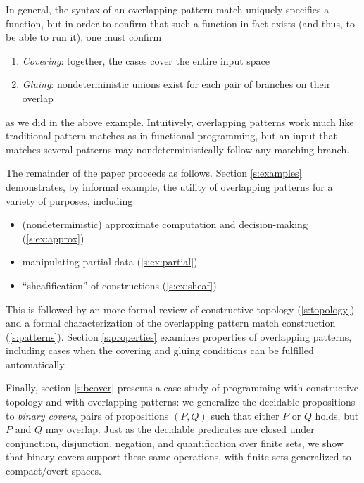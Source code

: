 \documentclass[conference]{IEEEtran}
\newcommand{\R}{\mathbb{R}}
\begin{document}
In general, the syntax of an overlapping pattern match uniquely specifies a function, but in order to confirm that such a function in fact exists (and thus, to be able to run it), one must confirm
\begin{enumerate}
\item \emph{Covering}: together, the cases cover the entire input space
\item \emph{Gluing}: nondeterministic unions exist for each pair of branches on their overlap
\end{enumerate}
as we did in the above example. Intuitively, overlapping patterns work much like traditional pattern matches as in functional programming, but an input that matches several patterns may nondeterministically follow any matching branch.


The remainder of the paper proceeds as follows. Section \ref{s:examples} demonstrates, by informal example, the utility of overlapping patterns for a variety of purposes, including
\begin{itemize}
\item (nondeterministic) approximate computation and decision-making (\ref{s:ex:approx})
\item manipulating partial data (\ref{s:ex:partial})
\item ``sheafification'' of constructions (\ref{s:ex:sheaf}).
\end{itemize}

This is followed by an more formal review of constructive topology (\ref{s:topology}) and a formal characterization of the overlapping pattern match construction (\ref{s:patterns}). Section \ref{s:properties} examines properties of overlapping patterns, including cases when the covering and gluing conditions can be fulfilled automatically. 

Finally, section \ref{s:bcover} presents a case study of programming with constructive topology and with overlapping patterns: we generalize the decidable propositions to \emph{binary covers}, pairs of propositions $(P, Q)$ such that either $P$ or $Q$ holds, but $P$ and $Q$ may overlap. Just as the decidable predicates are closed under conjunction, disjunction, negation, and quantification over finite sets, we show that binary covers support these same operations, with finite sets generalized to compact/overt spaces.
\end{document}
